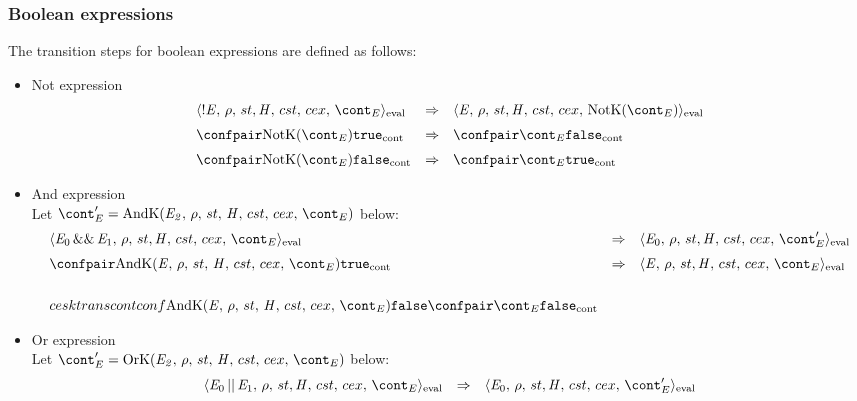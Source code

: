 \documentclass{article}
\begin{document}
\subsubsection{Boolean expressions}
\label{subsubsec:bool-expressions}
\newcommand{\true}{\tt{true}}
\newcommand{\false}{\tt{false}}
\newcommand{\NotK}[1]{\mathrm{NotK}({#1})}
\newcommand{\AndK}[6]{\mathrm{AndK}({#1},\,{#2},\,{#3},\,{\handler},\,{#4},\,{#5},\,{#6})}
\newcommand{\OrK}[6]{\mathrm{OrK}({#1},\,{#2},\,{#3},\,{\handler},\,{#4},\,{#5},\,{#6})}
\newcommand{\ConditionalK}[7]{\mathrm{ConditionalK}({#1},\,{#2},\,{#3},\,{#4},\,{\handler},\,{#5},\,{#6},\,{#7})}

The transition steps for boolean expressions are defined as follows:
\begin{itemize}
\item Not expression\\
\[
  \begin{array}{lll}
	\cesktrans{
		\evalconf{\Not{\expressionmeta}}{\env}{\strace}{\cstrace}{\cex}{\econt}}{
		\evalconf{\expressionmeta}{\env}{\strace}{\cstrace}{\cex}{\NotK{\econt}}}
		\\[2mm]

	\cesktrans{
		\contconf{\NotK{\econt}}{\true}}{
		\contconf{\econt}{\false}}
		\\[2mm]

	\cesktrans{
		\contconf{\NotK{\econt}}{\false}}{
		\contconf{\econt}{\true}}
  \end{array}
\]
\item And expression\\
Let $\econt' = \AndK{\expri{2}}{\env}{\strace}{\cstrace}{\cex}{\econt}$ below:
\[
  \begin{array}{lcl}
	\cesktrans{
		\evalconf{\AndExpression{\expressionmeta_0}{\expressionmeta_1}}{\env}{\strace}{\cstrace}{\cex}{\econt}}{
		\evalconf{\expressionmeta_0}{\env}{\strace}{\cstrace}{\cex}{\econt'}}
		\\[2mm]

	\cesktrans{
		\contconf{\AndK{\expressionmeta}{\env}{\strace}{\cstrace}{\cex}{\econt}}{\true}}{
		\evalconf{\expressionmeta}{\env}{\strace}{\cstrace}{\cex}{\econt}}
		\\[2mm]

	\\cesktrans{
		contconf{\AndK{\expressionmeta}{\env}{\strace}{\cstrace}{\cex}{\econt}}{\false}}{
		\contconf{\econt}{\false}}
  \end{array}
\]
\item Or expression\\
Let $\econt' = \OrK{\expri{2}}{\env}{\strace}{\cstrace}{\cex}{\econt}$ below:
\[
  \begin{array}{lcl}
	\cesktrans{
		\evalconf{\OrExpression{\expressionmeta_0}{\expressionmeta_1}}{\env}{\strace}{\cstrace}{\cex}{\econt}}{
		\evalconf{\expressionmeta_0}{\env}{\strace}{\cstrace}{\cex}{\econt'}}
		\\[2mm]


\end{array}\]
\end{itemize}
\end{document}
